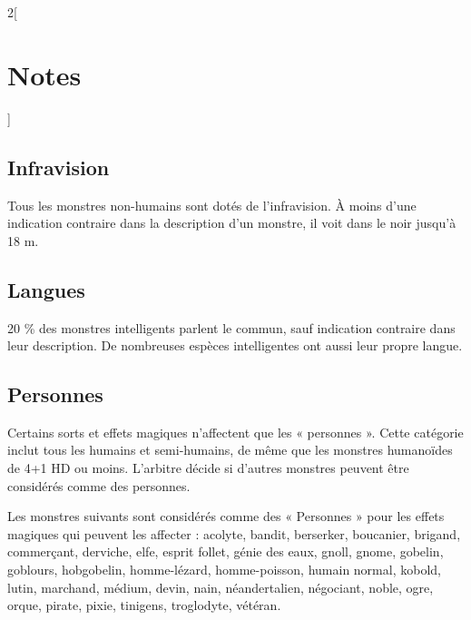 \begin{multicols}{2}[\section*{Notes}\label{notes-guxe9nuxe9rales}]

\subsection*{Infravision}\label{infravision}

Tous les monstres non-humains sont dotés de l'infravision. À moins
d'une indication contraire dans la description d'un monstre, il voit
dans le noir jusqu'à 18 m.

\subsection*{Langues}\label{langues}

20 \% des monstres intelligents parlent le commun, sauf indication contraire
dans leur description. De nombreuses espèces intelligentes ont aussi
leur propre langue.

\subsection*{Personnes}\label{personnes}

Certains sorts et effets magiques n'affectent que les « personnes ».
Cette catégorie inclut tous les humains et semi-humains, de même que les
monstres humanoïdes de 4+1 HD ou moins. L'arbitre décide si d'autres
monstres peuvent être considérés comme des personnes.

Les monstres suivants sont considérés comme des « Personnes » pour les
effets magiques qui peuvent les affecter : acolyte, bandit, berserker,
boucanier, brigand, commerçant, derviche, elfe, esprit follet, génie des
eaux, gnoll, gnome, gobelin, goblours, hobgobelin, homme-lézard,
homme-poisson, humain normal, kobold, lutin, marchand, médium, devin,
nain, néandertalien, négociant, noble, ogre, orque, pirate, pixie,
tinigens, troglodyte, vétéran.
\end{multicols}